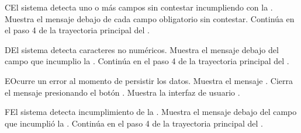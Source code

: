 \begin{UCtrayectoriaA}{C}{El sistema detecta uno o más campos sin contestar incumpliendo con la .}
	\UCpaso Muestra el mensaje  debajo de cada campo obligatorio sin contestar.
	\UCpaso Continúa en el paso 4 de la trayectoria principal del .
\end{UCtrayectoriaA}

\begin{UCtrayectoriaA}{D}{El sistema detecta caracteres no numéricos.}
	\UCpaso Muestra el mensaje  debajo del campo que incumplio la .
	\UCpaso Continúa en el paso 4 de la trayectoria principal del .
\end{UCtrayectoriaA}

\begin{UCtrayectoriaA}{E}{Ocurre un error al momento de persistir los datos.}
	\UCpaso Muestra el mensaje .
	\UCpaso[\UCactor] Cierra el mensaje presionando el botón .
	\UCpaso Muestra la interfaz de usuario .
\end{UCtrayectoriaA}



\begin{UCtrayectoriaA}{F}{El sistema detecta incumplimiento de la .}
	\UCpaso Muestra el mensaje  debajo del campo que incumplió la .
	\UCpaso Continúa en el paso 4 de la trayectoria principal del .
\end{UCtrayectoriaA}
